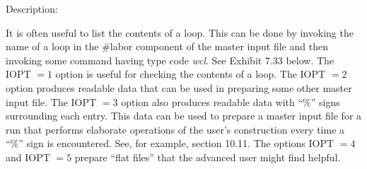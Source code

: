 \vspace{5mm}
     Description:
\vspace{2mm}

It is often useful to list the contents of a loop.  This can be done by invoking the name of a loop in the \#labor component of the master input file and then invoking some command having type code {\em wcl}.  See Exhibit 7.33 below.  The IOPT $= 1$ option is useful for checking the contents of a loop.  The IOPT $= 2$ option produces \Mary readable data that can be used in preparing some other \Mary master input file.  The IOPT $= 3$ option also produces \Mary readable data with ``\%'' signs surrounding each entry.  This data can be used to prepare a \Mary master input file for a \Mary run that performs elaborate operations of the user's construction every time a ``\%'' sign is encountered.  See, for example, section 10.11.  The options IOPT $= 4$ and IOPT $= 5$ prepare ``flat files'' that the advanced \Mary user might find helpful.

